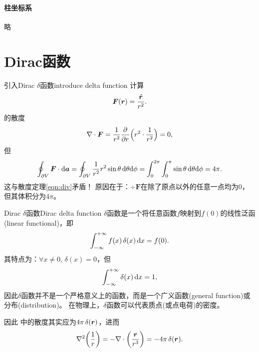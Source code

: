 \paragraph{柱坐标系}略
\section{Dirac函数}
\begin{example}{引入Dirac $\delta$函数}{introduce delta function}
    计算
    \[
        \bm F(\bm r)=\frac{\mathop{}\!\hat{\bm{r}}}{r^2}.
    \]
    的散度
    \[
        \nabla\cdot\bm F=\frac1{r^2}\frac{\partial^{{}}}{\partial{r}^{{}}}\Bigl(r^2\cdot\frac1{r^2}\Bigr)=0,
    \]
    但
    \[
        \oint_{\partial V}\bm F\cdot\mathop{}\!\mathrm{d}\bm a=\oint_{\partial V}\frac1{r^2}r^2\sin\theta\mathop{}\!\mathrm{d}\theta\mathrm{d}\phi=\int_0^{2\pi}\int_0^\pi\sin\theta\mathop{}\!\mathrm{d}\theta\mathrm{d}\phi=4\pi.
    \]
    这与散度定理\eqref{eqn:div}矛盾！
    原因在于：$\div\bm F$在除了原点以外的任意一点均为0，但其体积分为$4\pi$。
\end{example}
\begin{definition}{Dirac $\delta$函数}{Dirac delta function}
    $\delta$函数是一个将任意函数$f$映射到$f(0)$的线性泛函(linear functional)，即
    \[
        \int_{-\infty}^{+\infty} f(x)\mathop{}\!\delta(x)\mathop{}\!\mathrm{d} x=f(0).
    \]
    其特点为：$\forall x\neq 0,\,\delta(x)=0$，但
    \[
        \int_{-\infty}^{+\infty}\delta(x)\mathop{}\!\mathrm{d} x=1,
    \]
    因此$\delta$函数并不是一个严格意义上的函数，而是一个广义函数(general function)或分布(distribution)。
    在物理上，$\delta$函数可以代表质点(或点电荷)的密度。
\end{definition}

因此 中的散度其实应为$4\pi\mathop{}\!\delta(\bm r)$，进而
\begin{equation}
    \nabla^2\biggl(\frac1r\biggr)=-\nabla\cdot\biggl(\frac{\bm r}{r^3}\biggr)=-4\pi\mathop{}\!\delta(\bm r).
\end{equation}
